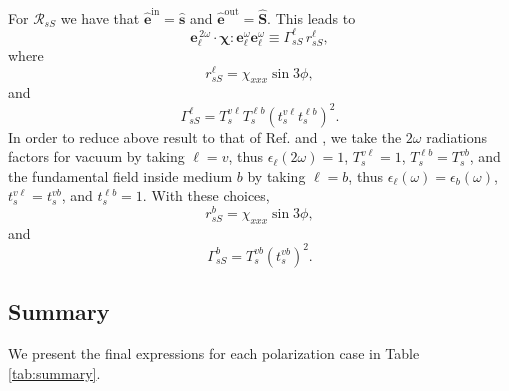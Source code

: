 \documentclass[10pt]{book}
\begin{document}
For $\mathcal{R}_{sS}$ we have that
$\hat{\mathbf{e}}^{\mathrm{in}}=\hat{\mathbf{s}}$ and
$\hat{\mathbf{e}}^{\mathrm{out}}=\hat{\mathbf{S}}$. This leads to
\begin{equation*}
\mathbf{e}^{\,2\omega}_{\ell}\cdot
\boldsymbol{\chi}:\mathbf{e}^\omega_{\ell}\mathbf{e}^\omega_{\ell}
\equiv\Gamma^{\ell}_{sS}\, r^{\ell}_{sS},
\end{equation*}
where
\begin{equation}
r^{\ell}_{sS} = \chi_{xxx}\sin3\phi,
\end{equation}
and
\begin{equation}
\Gamma^{\ell}_{sS}=
T^{v\ell}_{s}T^{\ell b}_{s}\left(t^{v\ell}_{s}t^{\ell b}_{s}\right)^{2}.
\end{equation} 
In order to reduce above result to that of Ref. \cite{mizrahiJOSA88} and
\cite{sipePRB87}, we take the $2\omega$ radiations factors for vacuum by
taking $\ell=v$, thus $\epsilon_{\ell}(2\omega)=1$, $T^{v\ell}_{s}=1$,
$T^{\ell b}_{s}=T^{vb}_{s}$, and the fundamental field inside medium $b$ by
taking $\ell=b$, thus $\epsilon_{\ell}(\omega)=\epsilon_{b}(\omega)$,
$t^{v\ell}_{s}=t^{vb}_{s}$, and $t^{\ell b}_{s}=1$. With these choices,
\begin{equation*}
r^{b}_{sS} = \chi_{xxx}\sin3\phi,
\end{equation*}
and 
\begin{equation*}
\Gamma^{b}_{sS} = T^{vb}_{s}\left(t^{vb}_{s}\right)^{2}.
\end{equation*} 


\subsection{Summary}

We present the final expressions for each polarization case in Table
\ref{tab:summary}.
\end{document}
